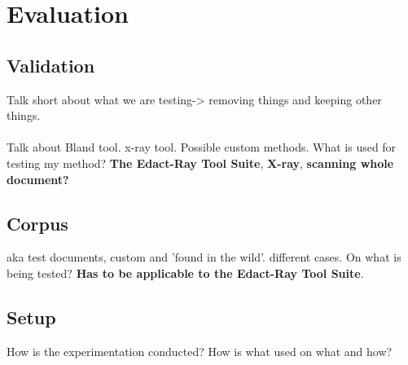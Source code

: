 \chapter{Evaluation}


\section{Validation}
Talk short about what we are testing-> removing things and keeping other things.
\\\\
Talk about Bland tool. x-ray tool. Possible custom methods. What is used for testing my method?
\textbf{The Edact-Ray Tool Suite}, \textbf{X-ray}, \textbf{scanning whole document?}

\section{Corpus}
aka test documents, custom and 'found in the wild'. different cases. On what is being tested? \textbf{Has to be applicable to the Edact-Ray Tool Suite}.

\section{Setup}
How is the experimentation conducted? How is what used on what and how?
\\\\
